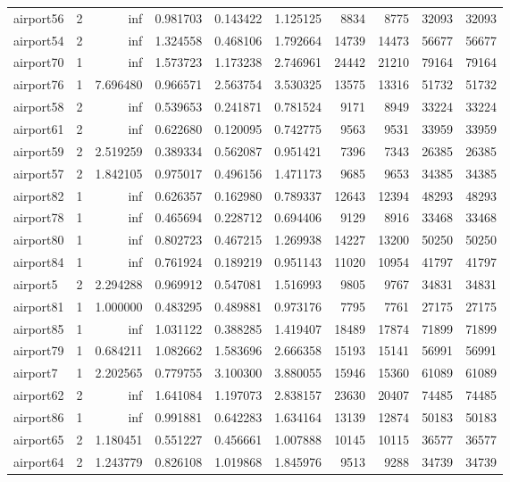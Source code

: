 \begin{longtable}{|l|r|r|r|r|r|r|r|r|r|}
airport56 & 2 & inf & 0.981703 & 0.143422 & 1.125125 & 8834 & 8775 & 32093 & 32093 \\
airport54 & 2 & inf & 1.324558 & 0.468106 & 1.792664 & 14739 & 14473 & 56677 & 56677 \\
airport70 & 1 & inf & 1.573723 & 1.173238 & 2.746961 & 24442 & 21210 & 79164 & 79164 \\
airport76 & 1 & 7.696480 & 0.966571 & 2.563754 & 3.530325 & 13575 & 13316 & 51732 & 51732 \\
airport58 & 2 & inf & 0.539653 & 0.241871 & 0.781524 & 9171 & 8949 & 33224 & 33224 \\
airport61 & 2 & inf & 0.622680 & 0.120095 & 0.742775 & 9563 & 9531 & 33959 & 33959 \\
airport59 & 2 & 2.519259 & 0.389334 & 0.562087 & 0.951421 & 7396 & 7343 & 26385 & 26385 \\
airport57 & 2 & 1.842105 & 0.975017 & 0.496156 & 1.471173 & 9685 & 9653 & 34385 & 34385 \\
airport82 & 1 & inf & 0.626357 & 0.162980 & 0.789337 & 12643 & 12394 & 48293 & 48293 \\
airport78 & 1 & inf & 0.465694 & 0.228712 & 0.694406 & 9129 & 8916 & 33468 & 33468 \\
airport80 & 1 & inf & 0.802723 & 0.467215 & 1.269938 & 14227 & 13200 & 50250 & 50250 \\
airport84 & 1 & inf & 0.761924 & 0.189219 & 0.951143 & 11020 & 10954 & 41797 & 41797 \\
airport5 & 2 & 2.294288 & 0.969912 & 0.547081 & 1.516993 & 9805 & 9767 & 34831 & 34831 \\
airport81 & 1 & 1.000000 & 0.483295 & 0.489881 & 0.973176 & 7795 & 7761 & 27175 & 27175 \\
airport85 & 1 & inf & 1.031122 & 0.388285 & 1.419407 & 18489 & 17874 & 71899 & 71899 \\
airport79 & 1 & 0.684211 & 1.082662 & 1.583696 & 2.666358 & 15193 & 15141 & 56991 & 56991 \\
airport7 & 1 & 2.202565 & 0.779755 & 3.100300 & 3.880055 & 15946 & 15360 & 61089 & 61089 \\
airport62 & 2 & inf & 1.641084 & 1.197073 & 2.838157 & 23630 & 20407 & 74485 & 74485 \\
airport86 & 1 & inf & 0.991881 & 0.642283 & 1.634164 & 13139 & 12874 & 50183 & 50183 \\
airport65 & 2 & 1.180451 & 0.551227 & 0.456661 & 1.007888 & 10145 & 10115 & 36577 & 36577 \\
airport64 & 2 & 1.243779 & 0.826108 & 1.019868 & 1.845976 & 9513 & 9288 & 34739 & 34739 \\

\end{longtable}
